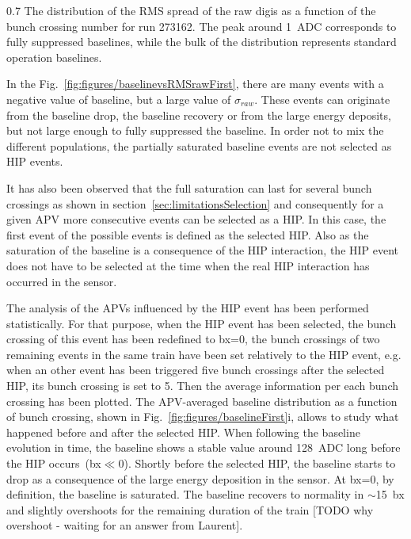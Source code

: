                  {0.7}       %
                 {The distribution of the RMS spread of the raw digis as a function of the bunch crossing number for run 273162. The peak around 1~ADC corresponds to fully suppressed baselines, while the bulk of the distribution represents standard operation baselines.  } %

In the Fig.~\ref{fig:figures/baselinevsRMSrawFirst}, there are many events with a negative value of baseline, but a large value of $\sigma_{raw}$. These events can originate from the baseline drop, the baseline recovery or from the large energy deposits, but not large enough to fully suppressed the baseline. In order not to mix the different populations, the partially saturated baseline events are not selected as HIP events. 

It has also been observed that the full saturation can last for several bunch crossings as shown in section~\ref{sec:limitationsSelection} and consequently for a given APV more consecutive events can be selected as a HIP. In this case, the first event of the possible events is defined as the selected HIP. Also as the saturation of the baseline is a consequence of the HIP interaction, the HIP event does not have to be selected at the time when the real HIP interaction has occurred in the sensor. 


The analysis of the APVs influenced by the HIP event has been performed statistically. For that purpose, when the HIP event has been selected, the bunch crossing of this event has been redefined to bx=0, the bunch crossings of two remaining events in the same train have been set relatively to the HIP event, e.g. when an other event has been triggered five bunch crossings after the selected HIP, its bunch crossing is set to 5. Then the average information per each bunch crossing has been plotted. The APV-averaged baseline distribution as a function of bunch crossing, shown in Fig.~\ref{fig:figures/baselineFirst}i, allows to study what happened before and after the selected HIP. When following the baseline evolution in time, the baseline shows a stable value around 128~ADC long before the HIP occurs~(bx$\ll$0). Shortly before the selected HIP, the baseline starts to drop as a consequence of the large energy deposition in the sensor. At bx=0, by definition, the baseline is saturated. The baseline recovers to normality in $\sim$15~bx and slightly overshoots for the remaining duration of the train [TODO why overshoot - waiting for an answer from Laurent].

